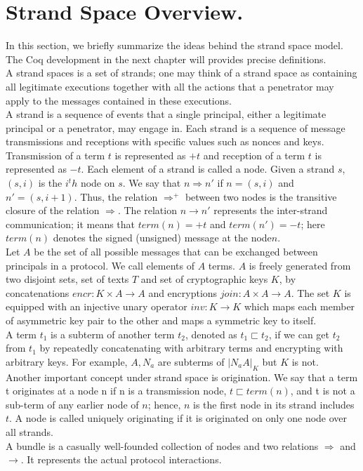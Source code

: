 \section{Strand Space Overview.}
In this section, we briefly summarize the ideas behind the strand space model. The Coq development in the next chapter will provides precise definitions.\\
A strand spaces is a set of strands; one may think of a strand space as containing all legitimate executions together with all the actions that a penetrator may apply to the messages contained in these executions.\\
A strand is a sequence of events that a single principal, either a legitimate principal or a penetrator, may engage in. Each strand is a sequence of message transmissions and receptions with specific values such as nonces and keys. Transmission of a term $t$ is represented as $+t$ and reception of a term $t$ is represented as $-t$. Each element of a strand is called a node. Given a strand $s$, $(s,i)$ is the $i^th$ node on $s$. We say that $n \Rightarrow n'$ if $n=(s,i)$ and $n'=(s,i+1)$. Thus, the relation $\Rightarrow^+$ between two nodes is the transitive closure of the relation $\Rightarrow$. The relation $n \rightarrow n'$ represents the inter-strand communication; it means that $term(n)=+t$ and $term(n')=-t$; here $term(n)$ denotes the signed (unsigned) message at the node$n$.\\
Let $A$ be the set of all possible messages that can be exchanged between principals in a protocol. We call elements of $A$ terms. $A$ is freely generated from two disjoint sets, set of texts $T$ and set of cryptographic keys $K$, by concatenations $encr : K \times A \rightarrow A$ and encryptions $join : A \times A \rightarrow A$. The set $K$ is equipped with an injective unary operator $inv : K \rightarrow K$ which maps each member of asymmetric key pair to the other and maps a symmetric key to itself.\\
A term $t_1$ is a subterm of another term $t_2$, denoted as $t_1 \sqsubset t_2$, if we can get $t_2$ from $t_1$ by repeatedly concatenating with arbitrary terms and encrypting with arbitrary keys. For example, $A, N_a$ are subterms of ${|N_aA|}_K$ but $K$ is not.\\
Another important concept under strand space is origination. We say that a term t originates at a node n if n is a transmission node, $t \sqsubset term(n)$, and t is not a sub-term of any earlier node of $n$; hence, $n$ is the first node in its strand includes $t$. A node is called uniquely originating if it is originated on only one node over all strands. \\
A bundle is a casually well-founded collection of nodes and two relations $\Rightarrow$ and $\rightarrow$. It represents the actual protocol interactions.  


